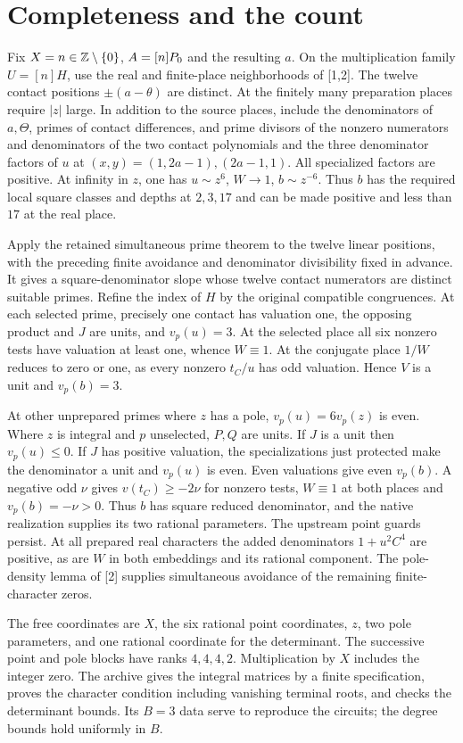 \documentclass[11pt]{article}
\begin{document}
\section{Completeness and the count}
Fix $X=n\in\mathbb Z\setminus\{0\}$, $A=[n]P_0$ and the resulting $a$. On the multiplication family $U=[n]H$, use the real and finite-place neighborhoods of [1,2]. The twelve contact positions $\pm(a-\theta)$ are distinct. At the finitely many preparation places require $|z|$ large. In addition to the source places, include the denominators of $a,\Theta$, primes of contact differences, and prime divisors of the nonzero numerators and denominators of the two contact polynomials and the three denominator factors of $u$ at $(x,y)=(1,2a-1),(2a-1,1)$. All specialized factors are positive. At infinity in $z$, one has $u\sim z^6$, $W\to1$, $b\sim z^{-6}$. Thus $b$ has the required local square classes and depths at $2,3,17$ and can be made positive and less than $17$ at the real place.

Apply the retained simultaneous prime theorem to the twelve linear positions, with the preceding finite avoidance and denominator divisibility fixed in advance. It gives a square-denominator slope whose twelve contact numerators are distinct suitable primes. Refine the index of $H$ by the original compatible congruences. At each selected prime, precisely one contact has valuation one, the opposing product and $J$ are units, and $v_p(u)=3$. At the selected place all six nonzero tests have valuation at least one, whence $W\equiv1$. At the conjugate place $1/W$ reduces to zero or one, as every nonzero $t_C/u$ has odd valuation. Hence $V$ is a unit and $v_p(b)=3$.

At other unprepared primes where $z$ has a pole, $v_p(u)=6v_p(z)$ is even. Where $z$ is integral and $p$ unselected, $P,Q$ are units. If $J$ is a unit then $v_p(u)\le0$. If $J$ has positive valuation, the specializations just protected make the denominator a unit and $v_p(u)$ is even. Even valuations give even $v_p(b)$. A negative odd $\nu$ gives $v(t_C)\ge-2\nu$ for nonzero tests, $W\equiv1$ at both places and $v_p(b)=-\nu>0$. Thus $b$ has square reduced denominator, and the native realization supplies its two rational parameters. The upstream point guards persist. At all prepared real characters the added denominators $1+u^2 C^4$ are positive, as are $W$ in both embeddings and its rational component. The pole-density lemma of [2] supplies simultaneous avoidance of the remaining finite-character zeros.

The free coordinates are $X$, the six rational point coordinates, $z$, two pole parameters, and one rational coordinate for the determinant. The successive point and pole blocks have ranks $4,4,4,2$. Multiplication by $X$ includes the integer zero. The archive gives the integral matrices by a finite specification, proves the character condition including vanishing terminal roots, and checks the determinant bounds. Its $B=3$ data serve to reproduce the circuits; the degree bounds hold uniformly in $B$.
\end{document}
